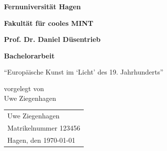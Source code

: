 \begin{titlepage}

{\Huge \textbf{Fernuniversität Hagen}}

{\Large\bfseries Fakultät für cooles MINT}

{\large\bfseries Prof. Dr. Daniel Düsentrieb}

\vspace*{4cm}

\begin{center}\bfseries\Large
Bachelorarbeit

\enquote{Europäische Kunst im \enquote{Licht} des 19. Jahrhunderts}

vorgelegt von \\ Uwe Ziegenhagen
\end{center}

\vfill
\begin{tabular}{l}
Uwe Ziegenhagen \\ 
Matrikelnummer 123456 \\
Hagen, den \today \\
\end{tabular}


\end{titlepage}